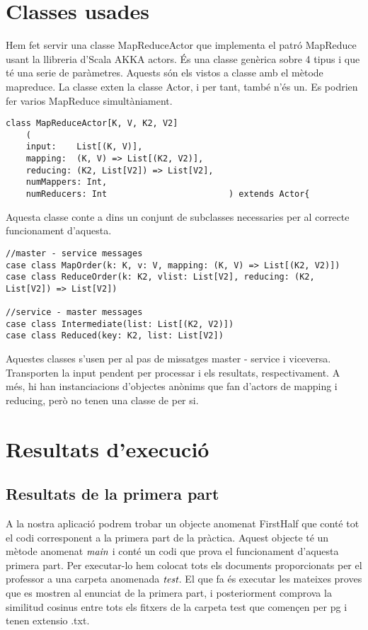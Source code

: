 \documentclass{report}
\begin{document}
\chapter{Classes usades}

Hem fet servir una classe MapReduceActor que implementa el patró MapReduce usant la llibreria d'Scala AKKA actors. És una classe genèrica sobre 4 tipus i que té una serie de paràmetres. Aquests són els vistos a classe amb el mètode mapreduce. La classe exten la classe Actor, i per tant, també n'és un. Es podrien fer varios MapReduce simultàniament.

\begin{lstlisting}[style=scalaHighlight]
class MapReduceActor[K, V, K2, V2]
    (
    input:    List[(K, V)],
    mapping:  (K, V) => List[(K2, V2)],
    reducing: (K2, List[V2]) => List[V2],
    numMappers: Int,
    numReducers: Int                        ) extends Actor{
\end{lstlisting}

Aquesta classe conte a dins un conjunt de subclasses necessaries per al correcte funcionament d'aquesta.

\begin{lstlisting}[style=scalaHighlight]
//master - service messages
case class MapOrder(k: K, v: V, mapping: (K, V) => List[(K2, V2)])
case class ReduceOrder(k: K2, vlist: List[V2], reducing: (K2, List[V2]) => List[V2])

//service - master messages
case class Intermediate(list: List[(K2, V2)])
case class Reduced(key: K2, list: List[V2])
\end{lstlisting}

Aquestes classes s'usen per al pas de missatges master - service i viceversa. Transporten la input pendent per processar i els resultats, respectivament. A més, hi han instanciacions d'objectes anònims que fan d'actors de mapping i reducing, però no tenen una classe de per si.

\chapter{Resultats d'execució}

\section{Resultats de la primera part}

A la nostra aplicació podrem trobar un objecte anomenat FirstHalf que conté tot el codi corresponent a la primera part de la pràctica. Aquest objecte té un mètode anomenat $\emph{main}$ i conté un codi que prova el funcionament d'aquesta primera part. Per executar-lo hem colocat tots els documents proporcionats per el professor a una carpeta anomenada $\emph{test}$. El que fa és executar les mateixes proves que es mostren al enunciat de la primera part, i posteriorment comprova la similitud cosinus entre tots els fitxers de la carpeta test que començen per pg i tenen extensio .txt.
\end{document}
